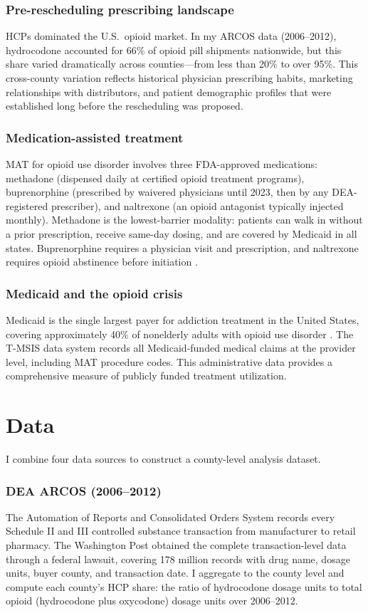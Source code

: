 \documentclass[12pt]{article}
\begin{document}
\subsubsection*{Pre-rescheduling prescribing landscape}  HCPs dominated the U.S.\ opioid market. In my ARCOS data (2006--2012), hydrocodone accounted for 66\% of opioid pill shipments nationwide, but this share varied dramatically across counties---from less than 20\% to over 95\%. This cross-county variation reflects historical physician prescribing habits, marketing relationships with distributors, and patient demographic profiles that were established long before the rescheduling was proposed.

\subsubsection*{Medication-assisted treatment}  MAT for opioid use disorder involves three FDA-approved medications: methadone (dispensed daily at certified opioid treatment programs), buprenorphine (prescribed by waivered physicians until 2023, then by any DEA-registered prescriber), and naltrexone (an opioid antagonist typically injected monthly). Methadone is the lowest-barrier modality: patients can walk in without a prior prescription, receive same-day dosing, and are covered by Medicaid in all states. Buprenorphine requires a physician visit and prescription, and naltrexone requires opioid abstinence before initiation \citep{volkow2018medication}.

\subsubsection*{Medicaid and the opioid crisis}  Medicaid is the single largest payer for addiction treatment in the United States, covering approximately 40\% of nonelderly adults with opioid use disorder \citep{saloner2018buprenorphine}. The T-MSIS data system records all Medicaid-funded medical claims at the provider level, including MAT procedure codes. This administrative data provides a comprehensive measure of publicly funded treatment utilization.

\section{Data}

I combine four data sources to construct a county-level analysis dataset.

\subsubsection*{DEA ARCOS (2006--2012)}  The Automation of Reports and Consolidated Orders System records every Schedule II and III controlled substance transaction from manufacturer to retail pharmacy. The Washington Post obtained the complete transaction-level data through a federal lawsuit, covering 178 million records with drug name, dosage units, buyer county, and transaction date. I aggregate to the county level and compute each county's HCP share: the ratio of hydrocodone dosage units to total opioid (hydrocodone plus oxycodone) dosage units over 2006--2012.
\end{document}
